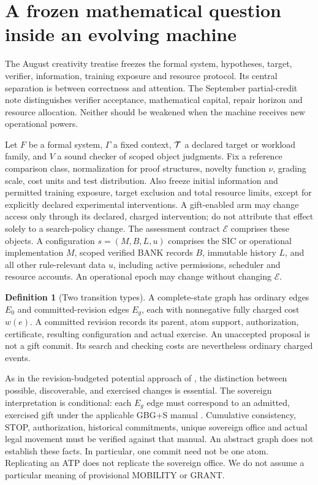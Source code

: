 \documentclass[11pt]{article}
\theoremstyle{definition}\newtheorem{definition}[theorem]{Definition}\newtheorem{conjecture}[theorem]{Conjecture}\newtheorem{example}[theorem]{Example}
\begin{document}
\section{A frozen mathematical question inside an evolving machine}
The August creativity treatise \cite{creativity} freezes the formal system, hypotheses, target, verifier, information, training exposure and resource protocol. Its central separation is between correctness and attention. The September partial-credit note \cite{partial} distinguishes verifier acceptance, mathematical capital, repair horizon and resource allocation. Neither should be weakened when the machine receives new operational powers.

Let $F$ be a formal system, $\Gamma$ a fixed context, $\mathcal T$ a declared target or workload family, and $V$ a sound checker of scoped object judgments. Fix a reference comparison class, normalization for proof structures, novelty function $\nu$, grading scale, cost units and test distribution. Also freeze initial information and permitted training exposure, target exclusion and total resource limits, except for explicitly declared experimental interventions. A gift-enabled arm may change access only through its declared, charged intervention; do not attribute that effect solely to a search-policy change. The assessment contract $\mathcal E$ comprises these objects. A configuration $s=(M,B,L,u)$ comprises the SIC or operational implementation $M$, scoped verified BANK records $B$, immutable history $L$, and all other rule-relevant data $u$, including active permissions, scheduler and resource accounts. An operational epoch may change without changing $\mathcal E$.

\begin{definition}[Two transition types]
A complete-state graph has ordinary edges $E_0$ and committed-revision edges $E_g$, each with nonnegative fully charged cost $w(e)$. A committed revision records its parent, atom support, authorization, certificate, resulting configuration and actual exercise. An unaccepted proposal is not a gift commit. Its search and checking costs are nevertheless ordinary charged events.
\end{definition}
As in the revision-budgeted potential approach of \cite{depths}, the distinction between possible, discoverable, and exercised changes is essential. The sovereign interpretation is conditional: each $E_g$ edge must correspond to an admitted, exercised gift under the applicable GBG+S manual \cite{gifts,braid}. Cumulative consistency, STOP, authorization, historical commitments, unique sovereign office and actual legal movement must be verified against that manual. An abstract graph does not establish these facts. In particular, one commit need not be one atom. Replicating an ATP does not replicate the sovereign office. We do not assume a particular meaning of provisional MOBILITY or GRANT.
\end{document}
